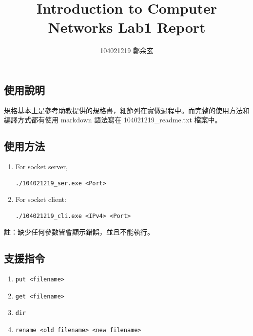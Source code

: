 \documentclass[a4paper]{article}
\begin{document}
\begin{CJK}{UTF8}{bsmi}
\title{Introduction to Computer Networks Lab1 Report}
\author{104021219 鄭余玄}
\date{}
\maketitle
\section{使用說明}
規格基本上是參考助教提供的規格書，細節列在實做過程中。而完整的使用方法和編譯方式都有使用 markdown 語法寫在 104021219\_readme.txt 檔案中。

\subsection{使用方法}
\begin{enumerate}
\item For socket server,
\begin{lstlisting}
./104021219_ser.exe <Port>
\end{lstlisting}
\item For socket client:
\begin{lstlisting}
./104021219_cli.exe <IPv4> <Port>
\end{lstlisting}
\end{enumerate}
註：缺少任何參數皆會顯示錯誤，並且不能執行。

\subsection{支援指令}
\begin{enumerate}
\item
\begin{lstlisting}
put <filename>
\end{lstlisting}

\item
\begin{lstlisting}
get <filename>
\end{lstlisting}

\item
\begin{lstlisting}
dir
\end{lstlisting}

\item
\begin{lstlisting}
rename <old filename> <new filename>
\end{lstlisting}
\end{enumerate}


\end{CJK}
\end{document}
